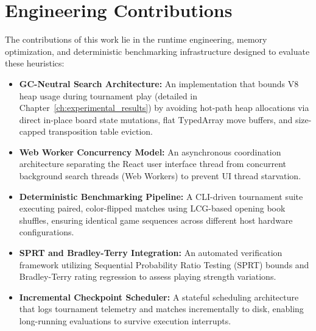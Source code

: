 \section{Engineering Contributions}
The contributions of this work lie in the runtime engineering, memory optimization, and deterministic benchmarking infrastructure designed to evaluate these heuristics:
\begin{itemize}
    \item \textbf{GC-Neutral Search Architecture:} An implementation that bounds V8 heap usage during tournament play (detailed in Chapter~\ref{ch:experimental_results}) by avoiding hot-path heap allocations via direct in-place board state mutations, flat TypedArray move buffers, and size-capped transposition table eviction.
    \item \textbf{Web Worker Concurrency Model:} An asynchronous coordination architecture separating the React user interface thread from concurrent background search threads (Web Workers) to prevent UI thread starvation.
    \item \textbf{Deterministic Benchmarking Pipeline:} A CLI-driven tournament suite executing paired, color-flipped matches using LCG-based opening book shuffles, ensuring identical game sequences across different host hardware configurations.
    \item \textbf{SPRT and Bradley-Terry Integration:} An automated verification framework utilizing Sequential Probability Ratio Testing (SPRT) bounds and Bradley-Terry rating regression to assess playing strength variations.
    \item \textbf{Incremental Checkpoint Scheduler:} A stateful scheduling architecture that logs tournament telemetry and matches incrementally to disk, enabling long-running evaluations to survive execution interrupts.
\end{itemize}


